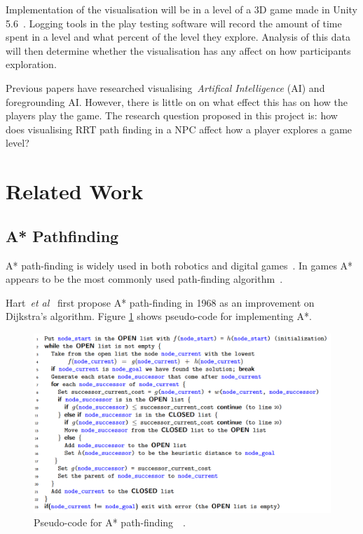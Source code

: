 \documentclass[journal]{IEEEtran}
\begin{document}
Implementation of the visualisation will be in a level of a 3D game made in Unity 5.6~\cite{software:Unity}. Logging tools in the play testing software will record the amount of time spent in a level and what percent of the level they explore.   Analysis of this data will then determine whether the visualisation has any affect on how participants exploration.

Previous papers have researched visualising~\textit{Artifical Intelligence} (AI) and foregrounding AI. However, there is little on on what effect this has on how the players play the game.
The research question proposed in this project is: how does visualising RRT path finding in a NPC affect how a player explores a game level?

\section{Related Work}

\subsection{A* Pathfinding}
A* path-finding is widely used in both robotics and digital games~\cite{Algfoor2015}. In games A* appears to be the most commonly used path-finding algorithm~\cite{Algfoor2015}.

Hart~\textit{et al}~\cite{Hart1968} first propose A* path-finding in 1968 as an improvement on Dijkstra's algorithm. Figure \ref{A*Pseudo} shows pseudo-code for implementing A*. 

\begin{figure}[h]
	\includegraphics[width=1.0\linewidth]{APseudocode.png}
	\caption{ Pseudo-code for A* path-finding~\cite{Hart1968}~\cite{pseudocode:A*}.}
	\label{A*Pseudo}
\end{figure} 
\end{document}
